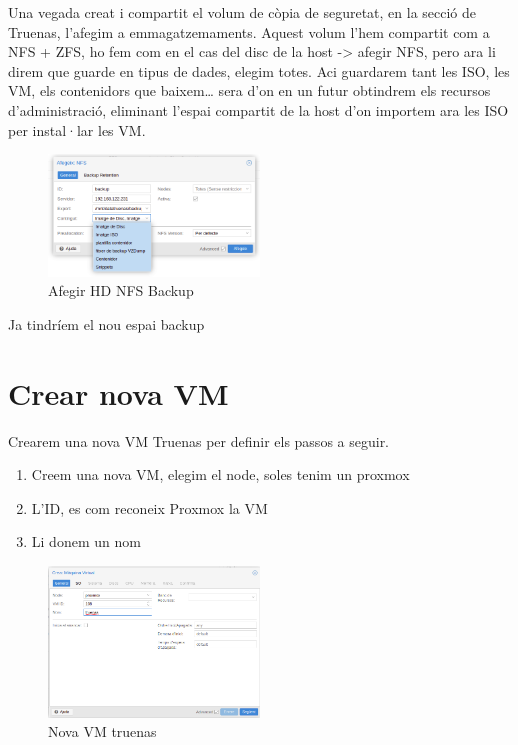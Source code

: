 \documentclass[
  10pt,
]{krantz}
\providecommand{\tightlist}{%
  \setlength{\itemsep}{0pt}\setlength{\parskip}{0pt}}
\begin{document}
Una vegada creat i compartit el volum de còpia de seguretat, en la secció de Truenas, l'afegim a emmagatzemaments. Aquest volum l'hem compartit com a NFS + ZFS, ho fem com en el cas del disc de la host -\textgreater{} afegir NFS, pero ara li direm que guarde en tipus de dades, elegim totes. Aci guardarem tant les ISO, les VM, els contenidors que baixem\ldots{} sera d'on en un futur obtindrem els recursos d'administració, eliminant l'espai compartit de la host d'on importem ara les ISO per instal·lar les VM.

\begin{figure}
\centering
\includegraphics[width=0.5\textwidth,height=\textheight]{imatges/proxmox/tipus_disk_backup.png}
\caption{Afegir HD NFS Backup}
\end{figure}

Ja tindríem el nou espai backup

\hypertarget{crear-nova-vm}{%
\section{Crear nova VM}\label{crear-nova-vm}}

Crearem una nova VM Truenas per definir els passos a seguir.

\begin{enumerate}
\def\labelenumi{\arabic{enumi}.}
\tightlist
\item
  Creem una nova VM, elegim el node, soles tenim un proxmox
\item
  L'ID, es com reconeix Proxmox la VM
\item
  Li donem un nom
\end{enumerate}

\begin{figure}
\centering
\includegraphics[width=0.5\textwidth,height=\textheight]{imatges/proxmox/install_truenas1.png}
\caption{Nova VM truenas}
\end{figure}
\end{document}
